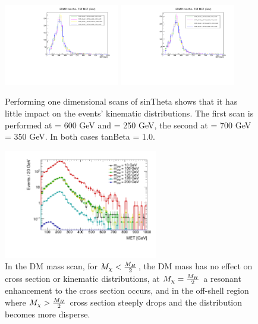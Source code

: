 \begin{figure}
\includegraphics[width=0.45\textwidth]{texinputs/04_grid/figures/monoz/leptonic/SinThetaScan_mH600ma250_MET.pdf}
\includegraphics[width=0.45\textwidth]{texinputs/04_grid/figures/monoz/leptonic/SinThetaScan_mH700ma350_MET.pdf}
\caption{Performing one dimensional scans of sinTheta shows that it has little impact on the events' kinematic distributions.  The first scan is performed at \mA = 600 GeV and \ma = 250 GeV, the second at \mA = 700 GeV \ma = 350 GeV.  In both cases tanBeta = 1.0.}
\end{figure}


\begin{figure}
\includegraphics[width=0.6\textwidth]{texinputs/04_grid/figures/monoz/leptonic/dm_scan_met_ll.pdf}

\caption{In the DM mass scan, for $M_{\chi} < \frac{M_{H}}{2}$, the DM mass has no effect on cross section or kinematic distributions, at $M_{\chi} = \frac{M_{H}}{2}$ a resonant enhancement to the cross section occurs, and in the off-shell region where  $M_{\chi} > \frac{M_{H}}{2}$ cross section steeply drops and the \MET distribution becomes more disperse.}
\label{fig:dm_scan_ll}
\end{figure}


